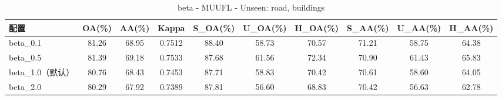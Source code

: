 \begin{table}[htbp]
\centering
\caption{beta - MUUFL - Unseen: road, buildings}
\begin{tabular}{lccccccccc}
\hline
配置 & OA(\%) & AA(\%) & Kappa & S\_OA(\%) & U\_OA(\%) & H\_OA(\%) & S\_AA(\%) & U\_AA(\%) & H\_AA(\%) \\
\hline
beta_0.1 & 81.26 & 68.95 & 0.7512 & 88.40 & 58.73 & 70.57 & 71.21 & 58.75 & 64.38 \\
beta_0.5 & 81.39 & 69.18 & 0.7533 & 87.68 & 61.56 & 72.34 & 70.90 & 61.43 & 65.83 \\
beta_1.0（默认） & 80.76 & 68.43 & 0.7453 & 87.71 & 58.83 & 70.42 & 70.61 & 58.60 & 64.05 \\
beta_2.0 & 80.29 & 67.92 & 0.7389 & 87.81 & 56.60 & 68.83 & 70.42 & 56.63 & 62.78 \\
\hline
\end{tabular}
\end{table}